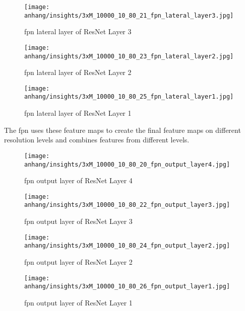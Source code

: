 	\begin{figure}[H]
		\centering
		\texttt{[image: anhang/insights/3xM\_10000\_10\_80\_21\_fpn\_lateral\_layer3.jpg]}
		\caption[\ac{fpn} lateral layer of ResNet Layer 3]{\ac{fpn} lateral layer of ResNet Layer 3}
	\end{figure}
	
	\begin{figure}[H]
		\centering
		\texttt{[image: anhang/insights/3xM\_10000\_10\_80\_23\_fpn\_lateral\_layer2.jpg]}
		\caption[\ac{fpn} lateral layer of ResNet Layer 2]{\ac{fpn} lateral layer of ResNet Layer 2}
	\end{figure}
	
	\begin{figure}[H]
		\centering
		\texttt{[image: anhang/insights/3xM\_10000\_10\_80\_25\_fpn\_lateral\_layer1.jpg]}
		\caption[\ac{fpn} lateral layer of ResNet Layer 1]{\ac{fpn} lateral layer of ResNet Layer 1}
	\end{figure}
	
	\FloatBarrier
	\clearpage
	The \ac{fpn} uses these feature maps to create the final feature maps on different resolution levels and combines features from different levels.
	
	\begin{figure}[H]
		\centering
		\texttt{[image: anhang/insights/3xM\_10000\_10\_80\_20\_fpn\_output\_layer4.jpg]}
		\caption[\ac{fpn} output layer of ResNet Layer 4]{\ac{fpn} output layer of ResNet Layer 4}
	\end{figure}
	
	\begin{figure}[H]
		\centering
		\texttt{[image: anhang/insights/3xM\_10000\_10\_80\_22\_fpn\_output\_layer3.jpg]}
		\caption[\ac{fpn} output layer of ResNet Layer 3]{\ac{fpn} output layer of ResNet Layer 3}
	\end{figure}
	
	\begin{figure}[H]
		\centering
		\texttt{[image: anhang/insights/3xM\_10000\_10\_80\_24\_fpn\_output\_layer2.jpg]}
		\caption[\ac{fpn} output layer of ResNet Layer 2]{\ac{fpn} output layer of ResNet Layer 2}
	\end{figure}
	
	\begin{figure}[H]
		\centering
		\texttt{[image: anhang/insights/3xM\_10000\_10\_80\_26\_fpn\_output\_layer1.jpg]}
		\caption[\ac{fpn} output layer of ResNet Layer 1]{\ac{fpn} output layer of ResNet Layer 1}
	\end{figure}
	
